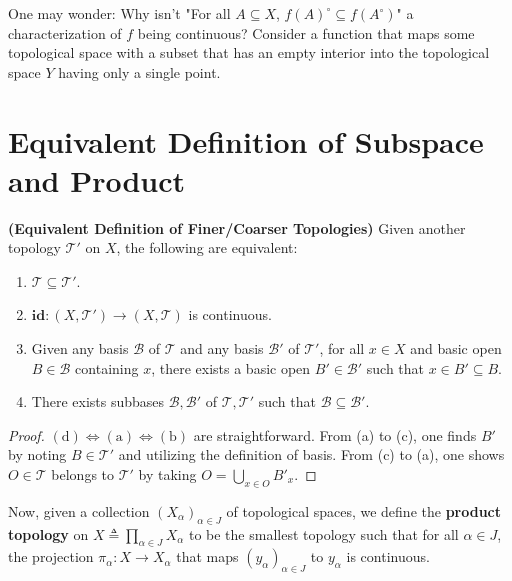 \documentclass{report}
\begin{document}
\begin{mdframed}
One may wonder: Why isn't "For all $A \subseteq X$, $f(A)^\circ  \subseteq f(A^\circ )$" a characterization of $f$ being continuous? Consider a function that maps some topological space with a subset that has an empty interior into the topological space $Y$ having only a single point.
\end{mdframed}
\section{Equivalent Definition of Subspace and Product}
\begin{abstract}

\end{abstract}
\begin{theorem}
\textbf{(Equivalent Definition of Finer/Coarser Topologies)} Given another topology $\mathscr{T}'$ on $X$, the following are equivalent:
\begin{enumerate}[label=(\alph*)]
    \item $\mathscr{T} \subseteq \mathscr{T}'$.
    \item $\textbf{id} : (X, \mathscr{T}') \to (X, \mathscr{T})$ is continuous.
    \item Given any basis $\mathcal{B}$ of $\mathscr{T}$ and any basis $\mathcal{B}'$ of $\mathscr{T}'$, for all $x \in X$ and basic open $B \in \mathcal{B}$ containing $x$, there exists a basic open $B' \in \mathcal{B}'$ such that $x \in B' \subseteq B$.
    \item There exists subbases $\mathcal{B}, \mathcal{B}'$ of $\mathscr{T}, \mathscr{T}'$ such that $\mathcal{B} \subseteq \mathcal{B}'$.
\end{enumerate}
\end{theorem}
\begin{proof}
$(\text{d})\iff (\text{a})\iff (\text{b})$ are straightforward. From (a) to (c), one finds $B'$ by noting $B \in \mathscr{T}'$ and utilizing the definition of basis. From (c) to (a), one shows $O \in \mathscr{T}$ belongs to $\mathscr{T}'$ by taking $O = \bigcup_{x \in O} B'_x$.
\end{proof}
\begin{mdframed}
Now, given a collection $(X_\alpha )_{\alpha \in J}$ of topological spaces, we define the \textbf{product topology} on $X \triangleq \prod_{\alpha \in J} X_\alpha$ to be the smallest topology such that for all $\alpha \in J$, the projection $\pi_\alpha : X \to X_\alpha$ that maps $(y_\alpha)_{\alpha \in J}$ to $y_\alpha$ is continuous.
\end{mdframed}
\end{document}
